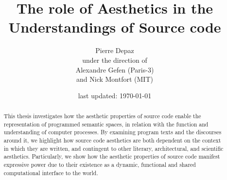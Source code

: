 \documentclass{report}
\begin{document}
\title{The role of Aesthetics in the Understandings of Source code}
\author{Pierre Depaz\\under the direction of\\Alexandre Gefen (Paris-3)\\and Nick Montfort (MIT)}
\date{last updated: \today}
\maketitle

\begin{abstract}
    This thesis investigates how the aesthetic properties of source code enable the representation of programmed semantic spaces, in relation with the function and understanding of computer processes. By examining program texts and the discourses around it, we highlight how source code aesthetics are both dependent on the context in which they are written, and contingent to other literary, architectural, and scientific aesthetics. Particularly, we show how the aesthetic properties of source code manifest expressive power due to their existence as a dynamic, functional and shared computational interface to the world.
\end{abstract}




\pagebreak



\pagebreak



\pagebreak



\pagebreak



\pagebreak






\end{document}
